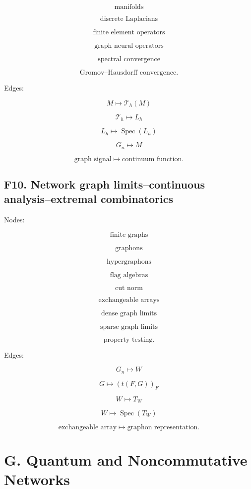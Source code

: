 \documentclass[11pt]{article}
\begin{document}
\[
\text{manifolds}
\]

\[
\text{discrete Laplacians}
\]

\[
\text{finite element operators}
\]

\[
\text{graph neural operators}
\]

\[
\text{spectral convergence}
\]

\[
\text{Gromov--Hausdorff convergence}.
\]

Edges:

\[
M\mapsto \mathcal T_h(M)
\]

\[
\mathcal T_h\mapsto L_h
\]

\[
L_h\mapsto \operatorname{Spec}(L_h)
\]

\[
G_n\mapsto M
\]

\[
\text{graph signal}\mapsto \text{continuum function}.
\]



\subsection{F10. Network graph limits--continuous analysis--extremal combinatorics}

Nodes:

\[
\text{finite graphs}
\]

\[
\text{graphons}
\]

\[
\text{hypergraphons}
\]

\[
\text{flag algebras}
\]

\[
\text{cut norm}
\]

\[
\text{exchangeable arrays}
\]

\[
\text{dense graph limits}
\]

\[
\text{sparse graph limits}
\]

\[
\text{property testing}.
\]

Edges:

\[
G_n\mapsto W
\]

\[
G\mapsto (t(F,G))_F
\]

\[
W\mapsto T_W
\]

\[
W\mapsto \operatorname{Spec}(T_W)
\]

\[
\text{exchangeable array}\mapsto \text{graphon representation}.
\]



\section{G. Quantum and Noncommutative Networks}
\end{document}
